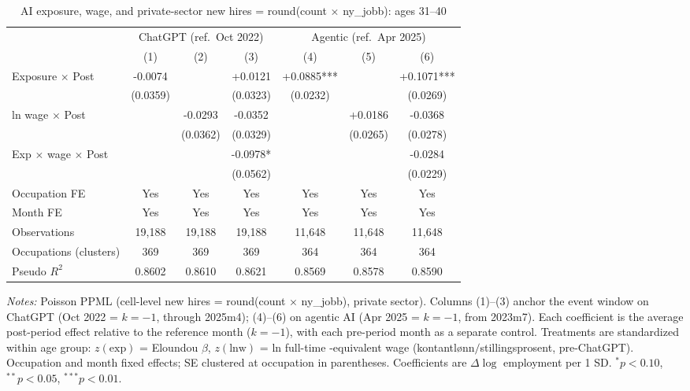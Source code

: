 \begin{table}[htbp]\centering
\caption{AI exposure, wage, and private-sector new hires = round(count $\times$ ny\_jobb): ages 31–40}
\label{tab:ca_did_age2}
\small
\begin{tabular}{lcccccc}
\toprule
 & \multicolumn{3}{c}{ChatGPT (ref.\ Oct 2022)} & \multicolumn{3}{c}{Agentic (ref.\ Apr 2025)} \\
\cmidrule(lr){2-4} \cmidrule(lr){5-7}
 & (1) & (2) & (3) & (4) & (5) & (6) \\
\midrule
Exposure $\times$ Post & -0.0074 &  & +0.0121 & +0.0885*** &  & +0.1071*** \\
 & (0.0359) &  & (0.0323) & (0.0232) &  & (0.0269) \\
ln wage $\times$ Post &  & -0.0293 & -0.0352 &  & +0.0186 & -0.0368 \\
 &  & (0.0362) & (0.0329) &  & (0.0265) & (0.0278) \\
Exp $\times$ wage $\times$ Post &  &  & -0.0978* &  &  & -0.0284 \\
 &  &  & (0.0562) &  &  & (0.0229) \\
\midrule
Occupation FE & Yes & Yes & Yes & Yes & Yes & Yes \\
Month FE & Yes & Yes & Yes & Yes & Yes & Yes \\
Observations & 19,188 & 19,188 & 19,188 & 11,648 & 11,648 & 11,648 \\
Occupations (clusters) & 369 & 369 & 369 & 364 & 364 & 364 \\
Pseudo $R^2$ & 0.8602 & 0.8610 & 0.8621 & 0.8569 & 0.8578 & 0.8590 \\
\bottomrule
\end{tabular}
\begin{minipage}{\linewidth}\vspace{2pt}\footnotesize
\emph{Notes:} Poisson PPML (cell-level new hires = round(count $\times$ ny\_jobb), private sector). Columns (1)--(3) anchor the event window on ChatGPT (Oct 2022 = $k{=}{-}1$, through 2025m4); (4)--(6) on agentic AI (Apr 2025 = $k{=}{-}1$, from 2023m7). Each coefficient is the average post-period effect relative to the reference month ($k{=}{-}1$), with each pre-period month as a separate control. Treatments are standardized within age group: $z(\text{exp})$ = Eloundou $\beta$, $z(\text{lnw})$ = ln full-time -equivalent wage (kontantl\o nn$/$stillingsprosent, pre-ChatGPT). Occupation and month fixed effects; SE clustered at occupation in parentheses. Coefficients are $\Delta\log$ employment per 1 SD. $^{*}p<0.10$, $^{**}p<0.05$, $^{***}p<0.01$.
\end{minipage}
\end{table}
